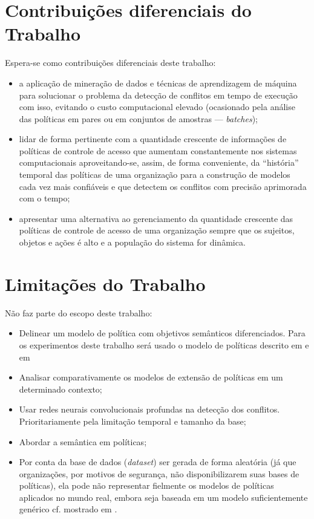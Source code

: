 \documentclass[
	12pt,				%
	openright,			%
	oneside,			%
	a4paper,			%
	english,			%
	french,				%
	spanish,			%
	brazil				%
	]{abntex2}
\begin{document}
\section{Contribuições diferenciais do Trabalho}\label{contribuicoes}
Espera-se como contribuições diferenciais deste trabalho:
\begin{itemize}
	\item a aplicação de mineração de dados e técnicas de aprendizagem de máquina para solucionar o problema da detecção de conflitos em tempo de execução com isso, evitando o custo computacional elevado (ocasionado pela análise das políticas em pares ou em conjuntos de amostras --- \textit{batches});
	\item lidar de forma pertinente com a quantidade crescente de informações de políticas de controle de acesso que aumentam constantemente nos sistemas computacionais aproveitando-se, assim, de forma conveniente, da ``história'' temporal das políticas de uma organização para a construção de modelos cada vez mais confiáveis e que detectem os conflitos com precisão aprimorada com o tempo;
	\item apresentar uma alternativa ao gerenciamento da quantidade crescente das políticas de controle de acesso de uma organização sempre que os sujeitos, objetos e ações é alto e a população do sistema for dinâmica.
	
\end{itemize} 

\section{Limitações do Trabalho}\label{limitacoes}
Não faz parte do escopo deste trabalho:
\begin{itemize}
	\item Delinear um modelo de política com objetivos semânticos diferenciados. Para os experimentos deste trabalho será usado o modelo de políticas descrito em  e em 
	\item Analisar comparativamente os modelos de extensão de políticas em um determinado contexto;
	\item Usar redes neurais convolucionais profundas na detecção dos conflitos. Prioritariamente pela limitação temporal e tamanho da base;
	\item Abordar a semântica em políticas;
	\item Por conta da base de dados (\textit{dataset}) ser gerada de forma aleatória (já que organizações, por motivos de segurança, não disponibilizarem suas bases de políticas), ela pode não representar fielmente os modelos de políticas aplicados no mundo real, embora seja baseada em um modelo suficientemente genérico cf. mostrado em .
\end{itemize} 
\end{document}
